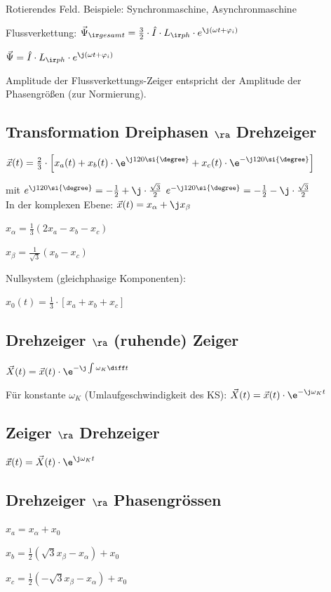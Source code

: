 \documentclass[german]{latex4ei_fs}
\begin{document}
\begin{sectionbox}
Rotierendes Feld. Beispiele: Synchronmaschine, Asynchronmaschine

Flussverkettung: $\vec \Psi_{\ir gesamt} = \frac{3}{2} \cdot \hat I \cdot L_{\ir ph} \cdot e^{\j ( \omega t + \varphi_i)}$

$\vec \Psi = \hat I \cdot L_{\ir ph} \cdot e^{\j (\omega t + \varphi_i)}$

Amplitude der Flussverkettungs-Zeiger entspricht der Amplitude der Phasengrößen (zur Normierung). \\

\subsection{Transformation Dreiphasen $\ra$ Drehzeiger}

$\vec x(t) = \frac{2}{3} \cdot \left[ x_a (t) + x_b (t) \cdot \e^{\j 120 \si{\degree}} + x_c (t) \cdot \e^{- \j 120 \si{\degree} } \right]$

mit
$e^{\j 120 \si{\degree}} = - \frac{1}{2} + \j \cdot \frac{\sqrt{3}}{2} $
\quad $e^{- \j 120 \si{\degree}} = - \frac{1}{2} - \j \cdot \frac{\sqrt{3}}{2} $ \\

In der komplexen Ebene: $\vec x (t)  = x_\alpha + \j x_\beta$

$x_\alpha  = \frac{1}{3} ( 2 x_a - x_b - x_c)$

$x_\beta = \frac{1}{\sqrt{3}} (x_b - x_c)$

Nullsystem (gleichphasige Komponenten):

$x_0 (t) = \frac{1}{3} \cdot \left[ x_a + x_b + x_c \right]$

\subsection{Drehzeiger $\ra$ (ruhende) Zeiger}

$\vec X(t) = \vec x (t) \cdot \e^{- \j \int \omega_K \diff t}$

Für konstante $\omega_K$ (Umlaufgeschwindigkeit des KS): $\vec X(t) = \vec x(t) \cdot \e^{- \j \omega_K t}$

\subsection{Zeiger $\ra$ Drehzeiger}

$\vec x(t) = \vec X (t) \cdot \e^{\j \omega_K t}$ 

\subsection{Drehzeiger $\ra$ Phasengrössen}
$x_a = x_\alpha + x_0$

$x_b = \frac{1}{2} ( \sqrt 3 x_\beta - x_\alpha ) + x_0$

$x_c = \frac{1}{2} (- \sqrt 3 x_\beta - x_\alpha ) + x_0$ 

\end{sectionbox}
\end{document}
